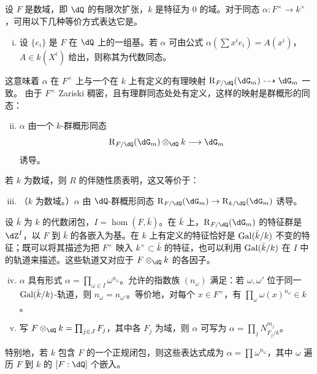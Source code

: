 \subsection{}\label{VI:5-1}
设 $F$ 是数域，即 $\dQ$ 的有限次扩张，$k$ 是特征为 $0$ 的域。对于同态 $\alpha:F^\times\to k^\times$，可用以下几种等价方式表达它是。
\begin{enumerate}[(i)]
\item 设 $\{e_i\}$ 是 $F$ 在 $\dQ$ 上的一组基。若 $\alpha$ 可由公式
$\alpha(\sum x^ie_i)=A(x^i)$，$A\in k(X^i)$ 给出，则称其为代数同态。
\end{enumerate}
这意味着 $\alpha$ 在 $F^\times$ 上与一个在 $k$ 上有定义的有理映射
$\res_{F/\dQ}(\dG_m)\dashrightarrow\dG_m$ 一致。
由于 $F^\times$ Zariski 稠密，且有理群同态处处有定义，这样的映射是群概形的同态：
\begin{enumerate}[(i)]\setcounter{enumi}{1}
\item $\alpha$ 由一个 $k$-群概形同态
\[\res_{F/\dQ}(\dG_m)\otimes_\dQ k\longrightarrow\dG_m\]
诱导。
\end{enumerate}
若 $k$ 为数域，则 $R$ 的伴随性质表明，这又等价于：
\begin{enumerate}[(i)]\setcounter{enumi}{2}
\item （$k$ 为数域。）$\alpha$ 由 $\dQ$-群概形同态
$\res_{F/\dQ}(\dG_m)\to\res_{k/\dQ}(\dG_m)$ 诱导。
\end{enumerate}
设 $\bar k$ 为 $k$ 的代数闭包，$I=\hom(F,\bar k)$。在 $\bar k$ 上，$\res_{F/\dQ}(\dG_m)$ 的特征群是 $\dZ^I$，以 $F$ 到 $\bar k$ 的各嵌入为基。在 $k$ 上有定义的特征恰好是 $\operatorname{Gal}(\bar k/k)$ 不变的特征；既可以将其描述为把 $F^\times$ 映入 $k^\times\subset\bar k$ 的特征，也可以利用 $\operatorname{Gal}(\bar k/k)$ 在 $I$ 中的轨道来描述。这些轨道又对应于 $F\otimes_\dQ k$ 的各因子。
\begin{enumerate}[(i)]\setcounter{enumi}{3}
\item $\alpha$ 具有形式 $\alpha=\prod_{\omega\in I}\omega^{n_\omega}$。允许的指数族 $(n_\omega)$ 满足：若 $\omega,\omega'$ 位于同一 $\operatorname{Gal}(\bar k/k)$-轨道，则 $n_\omega=n_{\omega'}$。等价地，对每个 $x\in F^\times$，有 $\prod_\omega\omega(x)^{n_\omega}\in k$。
\item 写 $F\otimes_\dQ k=\prod_{j\in J}F_j$，其中各 $F_j$ 为域，则 $\alpha$ 可写为 $\alpha=\prod_jN_{F_j/k}^{m_j}$。
\end{enumerate}
特别地，若 $k$ 包含 $F$ 的一个正规闭包，则这些表达式成为 $\alpha=\prod\omega^{n_\omega}$，其中 $\omega$ 遍历 $F$ 到 $k$ 的 $[F:\dQ]$ 个嵌入。

